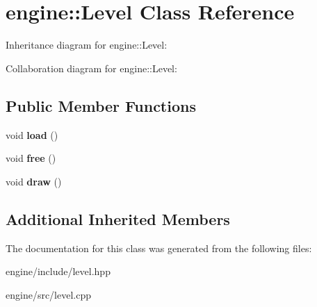 \hypertarget{classengine_1_1_level}{}\section{engine\+:\+:Level Class Reference}
\label{classengine_1_1_level}


Inheritance diagram for engine\+:\+:Level\+:


Collaboration diagram for engine\+:\+:Level\+:
\subsection*{Public Member Functions}
\begin{DoxyCompactItemize}
\item 
void {\bfseries load} ()\hypertarget{classengine_1_1_level_ab213ddeeb92129f90837246605430254}{}\label{classengine_1_1_level_ab213ddeeb92129f90837246605430254}

\item 
void {\bfseries free} ()\hypertarget{classengine_1_1_level_abb665514c17a427c4664dbc6bd1e488b}{}\label{classengine_1_1_level_abb665514c17a427c4664dbc6bd1e488b}

\item 
void {\bfseries draw} ()\hypertarget{classengine_1_1_level_a9b7478818e1aa80d3d4d059fa5faf9bf}{}\label{classengine_1_1_level_a9b7478818e1aa80d3d4d059fa5faf9bf}

\end{DoxyCompactItemize}
\subsection*{Additional Inherited Members}


The documentation for this class was generated from the following files\+:\begin{DoxyCompactItemize}
\item 
engine/include/level.\+hpp\item 
engine/src/level.\+cpp\end{DoxyCompactItemize}
